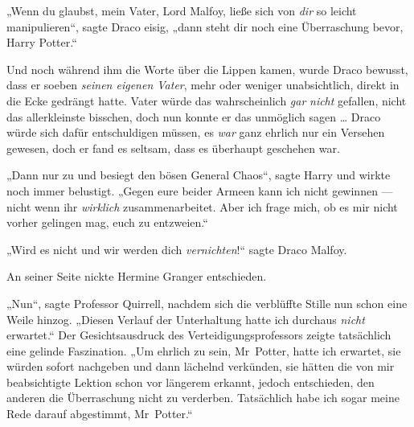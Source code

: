 „Wenn du glaubst, mein Vater, Lord Malfoy, ließe sich von \emph{dir} so leicht manipulieren“, sagte Draco eisig, „dann steht dir noch eine Überraschung bevor, Harry Potter.“

Und noch während ihm die Worte über die Lippen kamen, wurde Draco bewusst, dass er soeben \emph{seinen eigenen Vater}, mehr oder weniger unabsichtlich, direkt in die Ecke gedrängt hatte. Vater würde das wahrscheinlich \emph{gar} \emph{nicht} gefallen, nicht das allerkleinste bisschen, doch nun konnte er das unmöglich sagen … Draco würde sich dafür entschuldigen müssen, es \emph{war} ganz ehrlich nur ein Versehen gewesen, doch er fand es seltsam, dass es überhaupt geschehen war.

„Dann nur zu und besiegt den bösen General Chaos“, sagte Harry und wirkte noch immer belustigt.
„Gegen eure beider Armeen kann ich nicht gewinnen — nicht wenn ihr \emph{wirklich} zusammenarbeitet. Aber ich frage mich, ob es mir nicht vorher gelingen mag, euch zu entzweien.“

„Wird es nicht und wir werden dich \emph{vernichten}!“ sagte Draco Malfoy.

An seiner Seite nickte Hermine Granger entschieden.

„Nun“, sagte Professor Quirrell, nachdem sich die verblüffte Stille nun schon eine Weile hinzog.
„Diesen Verlauf der Unterhaltung hatte ich durchaus \emph{nicht} erwartet.“ Der Gesichtsausdruck des Verteidigungsprofessors zeigte tatsächlich eine gelinde Faszination.
„Um ehrlich zu sein, Mr~Potter, hatte ich erwartet, sie würden sofort nachgeben und dann lächelnd verkünden, sie hätten die von mir beabsichtigte Lektion schon vor längerem erkannt, jedoch entschieden, den anderen die Überraschung nicht zu verderben. Tatsächlich habe ich sogar meine Rede darauf abgestimmt, Mr~Potter.“

